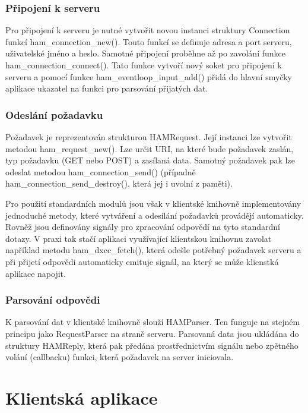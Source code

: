\subsubsection{Připojení k serveru}

Pro připojení k serveru je nutné vytvořit novou instanci struktury Connection funkcí ham\_connection\_new(). Touto funkcí
se definuje adresa a port serveru, uživatelské jméno a heslo. Samotné připojení proběhne až po zavolání funkce
ham\_connection\_connect(). Tato funkce vytvoří nový soket pro připojení k serveru a pomocí funkce ham\_eventloop\_input\_add()
přidá do hlavní smyčky aplikace ukazatel na funkci pro parsování přijatých dat.

\subsubsection{Odeslání požadavku}

Požadavek je reprezentován strukturou HAMRequest. Její instanci lze vytvořit metodou ham\_request\_new(). Lze určit
URI, na které bude požadavek zaslán, typ požadavku (GET nebo POST) a zasílaná data. Samotný požadavek pak lze odeslat
metodou ham\_connection\_send() (případně ham\_connection\_send\_destroy(), která jej i uvolní z paměti).

Pro použití standardních modulů jsou však v klientské knihovně implementovány jednoduché metody, které vytváření a odesílání
požadavků provádějí automaticky. Rovněž jsou definovány signály pro zpracování odpovědí na tyto standardní dotazy.
V praxi tak stačí aplikaci využívající klientskou knihovnu zavolat například metodu ham\_dxcc\_fetch(), která odešle
potřebný požadavek serveru a při přijetí odpovědi automaticky emituje signál, na který se může klienstká aplikace napojit.

\subsubsection{Parsování odpovědi}

K parsování dat v klientské knihovně slouží HAMParser. Ten funguje na stejném principu jako RequestParser na straně serveru.
Parsovaná data jsou ukládána do struktury HAMReply, která pak předána prostřednictvím signálu nebo zpětného volání (callbacku)
funkci, která požadavek na server iniciovala.

\section{Klientská aplikace}
\label{implementace_klient}

